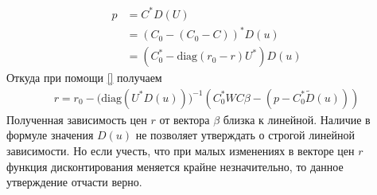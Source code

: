 \documentclass[10pt]{article}
\theoremstyle{definition}
\theoremstyle{remark}
\theoremstyle{plain}
\newcommand{\wt}{\widetilde}
\newcommand{\diag}{\mathrm{diag}}
\begin{document}
\begin{align*}
p &= C^*D(U)\\
&= (C_0 - (C_0 - C))^*D(u) \\
&= (C^*_0 - \diag(r_0 - r)U^*)D(u)
\end{align*}
Откуда при помощи \eqref{} получаем
\begin{align}
r = r_0 - \Big(\diag\left(U^*D(u)\right)\Big)^{-1}
\left(C_0^*WC\beta - (p-C_0^*\wt{D}(u))\right) \label{swap_price_from_beta}
\end{align}
Полученная зависимость цен $r$ от вектора $\beta$ близка к линейной. Наличие в формуле значения $D(u)$  не позволяет утверждать о строгой линейной зависимости. Но если учесть, что при малых изменениях в векторе цен $r$ функция дисконтирования меняется крайне незначительно, то данное утверждение отчасти верно. 
\end{document}
